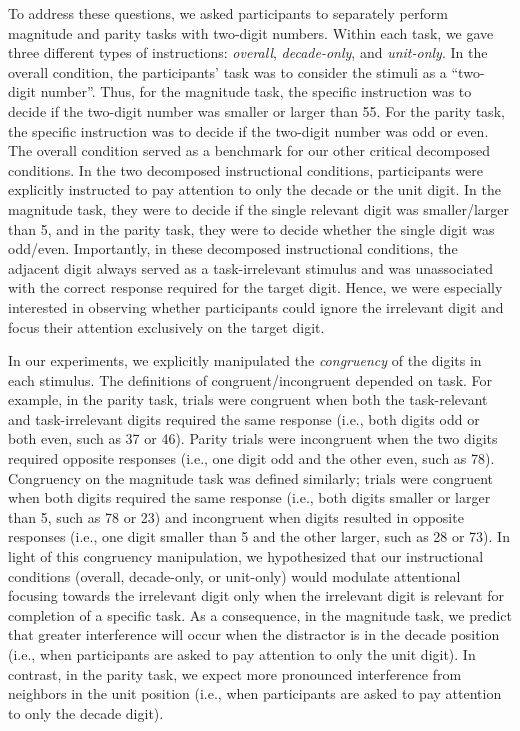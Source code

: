\documentclass[english,man]{apa6}
\theoremstyle{definition}
\theoremstyle{definition}
\theoremstyle{definition}
\theoremstyle{remark}
\begin{document}
To address these questions, we asked participants to separately perform
magnitude and parity tasks with two-digit numbers. Within each task, we
gave three different types of instructions: \emph{overall},
\emph{decade-only}, and \emph{unit-only}. In the overall condition, the
participants' task was to consider the stimuli as a \enquote{two-digit
number}. Thus, for the magnitude task, the specific instruction was to
decide if the two-digit number was smaller or larger than 55. For the
parity task, the specific instruction was to decide if the two-digit
number was odd or even. The overall condition served as a benchmark for
our other critical decomposed conditions. In the two decomposed
instructional conditions, participants were explicitly instructed to pay
attention to only the decade or the unit digit. In the magnitude task,
they were to decide if the single relevant digit was smaller/larger than
5, and in the parity task, they were to decide whether the single digit
was odd/even. Importantly, in these decomposed instructional conditions,
the adjacent digit always served as a task-irrelevant stimulus and was
unassociated with the correct response required for the target digit.
Hence, we were especially interested in observing whether participants
could ignore the irrelevant digit and focus their attention exclusively
on the target digit.

In our experiments, we explicitly manipulated the \emph{congruency} of
the digits in each stimulus. The definitions of congruent/incongruent
depended on task. For example, in the parity task, trials were congruent
when both the task-relevant and task-irrelevant digits required the same
response (i.e., both digits odd or both even, such as 37 or 46). Parity
trials were incongruent when the two digits required opposite responses
(i.e., one digit odd and the other even, such as 78). Congruency on the
magnitude task was defined similarly; trials were congruent when both
digits required the same response (i.e., both digits smaller or larger
than 5, such as 78 or 23) and incongruent when digits resulted in
opposite responses (i.e., one digit smaller than 5 and the other larger,
such as 28 or 73). In light of this congruency manipulation, we
hypothesized that our instructional conditions (overall, decade-only, or
unit-only) would modulate attentional focusing towards the irrelevant
digit only when the irrelevant digit is relevant for completion of a
specific task. As a consequence, in the magnitude task, we predict that
greater interference will occur when the distractor is in the decade
position (i.e., when participants are asked to pay attention to only the
unit digit). In contrast, in the parity task, we expect more pronounced
interference from neighbors in the unit position (i.e., when
participants are asked to pay attention to only the decade digit).
\end{document}
